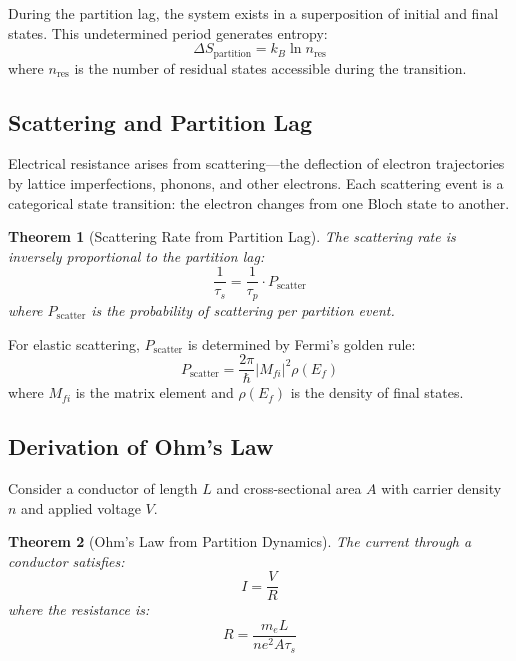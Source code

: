 \documentclass[twocolumn,showpacs,preprintnumbers,amsmath,amssymb,prd]{revtex4-2}
\newtheorem{theorem}{Theorem}[section]
\newcommand{\taup}{\tau_p}
\newcommand{\taus}{\tau_s}
\begin{document}
During the partition lag, the system exists in a superposition of initial and final states. This undetermined period generates entropy:
\begin{equation}
\Delta S_{\text{partition}} = k_B \ln n_{\text{res}}
\label{eq:partition_entropy}
\end{equation}
where $n_{\text{res}}$ is the number of residual states accessible during the transition.

\subsection{Scattering and Partition Lag}

Electrical resistance arises from scattering---the deflection of electron trajectories by lattice imperfections, phonons, and other electrons. Each scattering event is a categorical state transition: the electron changes from one Bloch state to another.

\begin{theorem}[Scattering Rate from Partition Lag]
\label{thm:scattering_rate}
The scattering rate is inversely proportional to the partition lag:
\begin{equation}
\frac{1}{\taus} = \frac{1}{\taup} \cdot P_{\text{scatter}}
\label{eq:scattering_rate}
\end{equation}
where $P_{\text{scatter}}$ is the probability of scattering per partition event.
\end{theorem}

For elastic scattering, $P_{\text{scatter}}$ is determined by Fermi's golden rule:
\begin{equation}
P_{\text{scatter}} = \frac{2\pi}{\hbar} |M_{fi}|^2 \rho(E_f)
\label{eq:fermi_golden_rule}
\end{equation}
where $M_{fi}$ is the matrix element and $\rho(E_f)$ is the density of final states.

\subsection{Derivation of Ohm's Law}

Consider a conductor of length $L$ and cross-sectional area $A$ with carrier density $n$ and applied voltage $V$.

\begin{theorem}[Ohm's Law from Partition Dynamics]
\label{thm:ohm}
The current through a conductor satisfies:
\begin{equation}
I = \frac{V}{R}
\label{eq:ohm}
\end{equation}
where the resistance is:
\begin{equation}
R = \frac{m_e L}{n e^2 A \taus}
\label{eq:resistance}
\end{equation}
\end{theorem}
\end{document}
